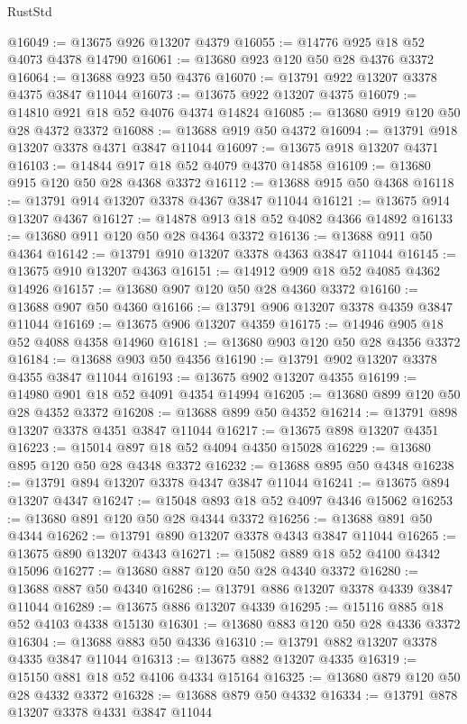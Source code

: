 \begin{lexlean}{RustStd}
\begin{coremodule}
@16049 := @13675 @926 @13207 @4379
@16055 := @14776 @925 @18 @52 @4073 @4378 @14790
@16061 := @13680 @923 @120 @50 @28 @4376 @3372
@16064 := @13688 @923 @50 @4376
@16070 := @13791 @922 @13207 @3378 @4375 @3847 @11044
@16073 := @13675 @922 @13207 @4375
@16079 := @14810 @921 @18 @52 @4076 @4374 @14824
@16085 := @13680 @919 @120 @50 @28 @4372 @3372
@16088 := @13688 @919 @50 @4372
@16094 := @13791 @918 @13207 @3378 @4371 @3847 @11044
@16097 := @13675 @918 @13207 @4371
@16103 := @14844 @917 @18 @52 @4079 @4370 @14858
@16109 := @13680 @915 @120 @50 @28 @4368 @3372
@16112 := @13688 @915 @50 @4368
@16118 := @13791 @914 @13207 @3378 @4367 @3847 @11044
@16121 := @13675 @914 @13207 @4367
@16127 := @14878 @913 @18 @52 @4082 @4366 @14892
@16133 := @13680 @911 @120 @50 @28 @4364 @3372
@16136 := @13688 @911 @50 @4364
@16142 := @13791 @910 @13207 @3378 @4363 @3847 @11044
@16145 := @13675 @910 @13207 @4363
@16151 := @14912 @909 @18 @52 @4085 @4362 @14926
@16157 := @13680 @907 @120 @50 @28 @4360 @3372
@16160 := @13688 @907 @50 @4360
@16166 := @13791 @906 @13207 @3378 @4359 @3847 @11044
@16169 := @13675 @906 @13207 @4359
@16175 := @14946 @905 @18 @52 @4088 @4358 @14960
@16181 := @13680 @903 @120 @50 @28 @4356 @3372
@16184 := @13688 @903 @50 @4356
@16190 := @13791 @902 @13207 @3378 @4355 @3847 @11044
@16193 := @13675 @902 @13207 @4355
@16199 := @14980 @901 @18 @52 @4091 @4354 @14994
@16205 := @13680 @899 @120 @50 @28 @4352 @3372
@16208 := @13688 @899 @50 @4352
@16214 := @13791 @898 @13207 @3378 @4351 @3847 @11044
@16217 := @13675 @898 @13207 @4351
@16223 := @15014 @897 @18 @52 @4094 @4350 @15028
@16229 := @13680 @895 @120 @50 @28 @4348 @3372
@16232 := @13688 @895 @50 @4348
@16238 := @13791 @894 @13207 @3378 @4347 @3847 @11044
@16241 := @13675 @894 @13207 @4347
@16247 := @15048 @893 @18 @52 @4097 @4346 @15062
@16253 := @13680 @891 @120 @50 @28 @4344 @3372
@16256 := @13688 @891 @50 @4344
@16262 := @13791 @890 @13207 @3378 @4343 @3847 @11044
@16265 := @13675 @890 @13207 @4343
@16271 := @15082 @889 @18 @52 @4100 @4342 @15096
@16277 := @13680 @887 @120 @50 @28 @4340 @3372
@16280 := @13688 @887 @50 @4340
@16286 := @13791 @886 @13207 @3378 @4339 @3847 @11044
@16289 := @13675 @886 @13207 @4339
@16295 := @15116 @885 @18 @52 @4103 @4338 @15130
@16301 := @13680 @883 @120 @50 @28 @4336 @3372
@16304 := @13688 @883 @50 @4336
@16310 := @13791 @882 @13207 @3378 @4335 @3847 @11044
@16313 := @13675 @882 @13207 @4335
@16319 := @15150 @881 @18 @52 @4106 @4334 @15164
@16325 := @13680 @879 @120 @50 @28 @4332 @3372
@16328 := @13688 @879 @50 @4332
@16334 := @13791 @878 @13207 @3378 @4331 @3847 @11044

\end{coremodule}
\end{lexlean}
